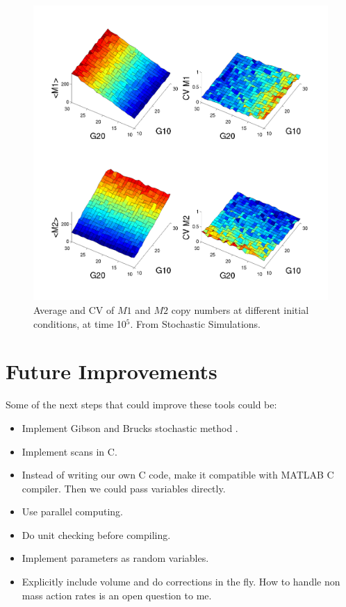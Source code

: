 \documentclass[letterpaper]{article}
\begin{document}
\begin{figure}[H]
  \centering
  \includegraphics[scale=0.4]{figures/rna2_doc4_scanss_2.png}
  \caption{Average and CV of $M1$ and $M2$ copy numbers at different
    initial conditions, at time 10$^5$. From Stochastic Simulations.}
  \label{fig:scanss}
\end{figure}

\section{Future Improvements}

Some of the next steps that could improve these tools could be:
\begin{itemize}
\item Implement Gibson and Brucks stochastic method \citep{Gibson2000}.
\item Implement scans in C.
\item Instead of writing our own C code, make it compatible with
  MATLAB C compiler. Then we could pass variables directly.
\item Use parallel computing.

\item Do unit checking before compiling.
\item Implement parameters as random variables.
\item Explicitly include volume and do corrections in the fly. How to
  handle non mass action rates is an open question to me.

\end{itemize}

\footnotesize


\end{document}
